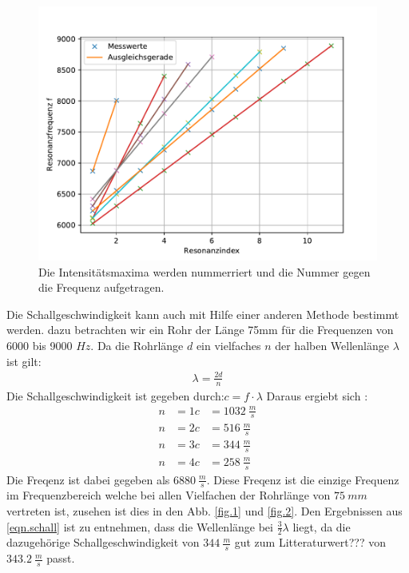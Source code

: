\begin{figure}[h!]
  \centering
  \includegraphics[width=\textwidth]{linearfit.pdf}
  \caption{Die Intensitätsmaxima werden nummerriert und die Nummer gegen die Frequenz aufgetragen.}
  \label{fig.linearfit}
\end{figure}
\FloatBarrier
Die Schallgeschwindigkeit kann auch mit Hilfe einer anderen Methode bestimmt werden.
dazu betrachten wir ein Rohr der Länge 75mm für die Frequenzen von 6000 bis 9000 $\si{Hz}$.
Da die Rohrlänge $d$ ein vielfaches $n$ der halben Wellenlänge $\lambda$ ist gilt:
\begin{align*}
  \lambda = \frac{2d}{n}
\end{align*}
Die Schallgeschwindigkeit ist gegeben durch:$c=f \cdot \lambda$
Daraus ergiebt sich :
\begin{align}
  n&=1  c&=\SI{1032}{\frac{m}{s}}\\
  n&=2  c&=\SI{516}{\frac{m}{s}}\\
  n&=3  c&=\SI{344}{\frac{m}{s}}\\
  \label{eqn.schall}
  n&=4  c&=\SI{258}{\frac{m}{s}}
\end{align}
Die Freqenz ist dabei gegeben als $\SI{6880}{\frac{m}{s}}$.
Diese Freqenz ist die einzige Frequenz im Frequenzbereich welche bei allen Vielfachen der Rohrlänge von $\SI{75}{mm}$ vertreten ist,
zusehen ist dies in den Abb. \ref{fig.1} und \ref{fig.2}.
Den Ergebnissen aus \ref{eqn.schall} ist zu entnehmen, dass die Wellenlänge bei $\frac{3}{2}\lambda$ liegt, da die dazugehörige Schallgeschwindigkeit von $\SI{344}{\frac{m}{s}}$ gut zum Litteraturwert??? von $\SI{343.2}{\frac{m}{s}}$ passt.

